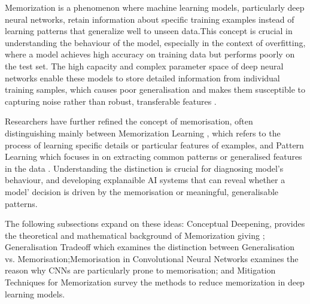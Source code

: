 Memorization is a phenomenon where machine learning models, particularly deep neural networks, retain information about specific training examples instead of learning patterns that generalize well to unseen data.This concept is crucial in understanding the behaviour of the model, especially in the context of overfitting, where a model achieves high accuracy   on training data but performs poorly on the test set. The high capacity and complex parameter space of deep neural networks enable these models to store detailed information from individual training samples, which causes poor generalisation and makes them susceptible to capturing noise rather than robust, transferable features \cite{ali_raza_537a9747}. 

Researchers have further refined the concept of memorisation,  often distinguishing mainly between Memorization Learning , which refers to the process of learning specific details or particular features of examples, and Pattern Learning which focuses in on extracting common patterns or generalised features  in the data \cite{jiaheng_wei_8cfd95ec}. Understanding the distinction is crucial for diagnosing model’s behaviour, and developing explanaible AI systems that can reveal whether a  model’ decision is driven by the memorisation or meaningful, generalisable patterns. 

The following subsections expand on these ideas: Conceptual Deepening,  provides the theoretical and mathematical background of Memorization giving ; Generalisation Tradeoff which examines the distinction between Generalisation vs. Memorisation;Memorisation in Convolutional Neural Networks  examines the reason why CNNs are particularly prone to memorisation; and  Mitigation Techniques for Memorization survey the methods to reduce memorization in deep learning models.
